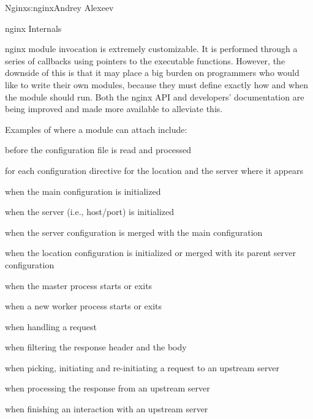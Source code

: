 \begin{aosachapter}{Nginx}{s:nginx}{Andrey Alexeev}
\begin{aosasect1}{nginx Internals}
\begin{aosaenumerate}
\end{aosaenumerate}

nginx module invocation is extremely customizable. It is performed
through a series of callbacks using pointers to the executable
functions. However, the downside of this is that it may place a big
burden on programmers who would like to write their own modules,
because they must define exactly how and when the module should
run. Both the nginx API and developers' documentation are being
improved and made more available to alleviate this.

Examples of where a module can attach include:

\begin{aosaitemize}

\item before the configuration file is read and processed

\item for each configuration directive for the location and the server
  where it appears

\item when the main configuration is initialized

\item when the server (i.e., host/port) is initialized

\item when the server configuration is merged with the main
  configuration

\item when the location configuration is initialized or merged with
  its parent server configuration

\item when the master process starts or exits

\item when a new worker process starts or exits

\item when handling a request

\item when filtering the response header and the body

\item when picking, initiating and re-initiating a request to an
  upstream server

\item when processing the response from an upstream server

\item when finishing an interaction with an upstream server


\end{aosaitemize}
\end{aosasect1}
\end{aosachapter}

